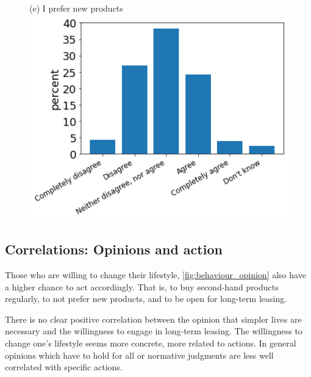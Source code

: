 \documentclass[12pt]{article}
\begin{document}
\begin{figure}[h!!]
\begin{minipage}[h!!]{0.32\textwidth}
\end{minipage}
	\begin{minipage}[h!!]{0.32\textwidth}  
	\centering\footnotesize{(e) I prefer new products}
	\includegraphics[width=1\textwidth]{../codding_data/results/liss/qk20a148title0.png}
\end{minipage}
\end{figure}

\subsection{Correlations: Opinions and action}
Those who are willing to change their lifestyle, \ref{fig:behaviour_opinion} also have a higher chance to act accordingly. That is, to buy second-hand products regularly, to not prefer new products, and to be open for long-term leasing. 

There is no clear positive correlation between the opinion that simpler lives are necessary and the willingness to engage in long-term leasing. The willingness to change one's lifestyle seems more concrete, more related to actions. In general opinions which have to hold for all or normative judgments are less well correlated with specific actions. 
\end{document}
